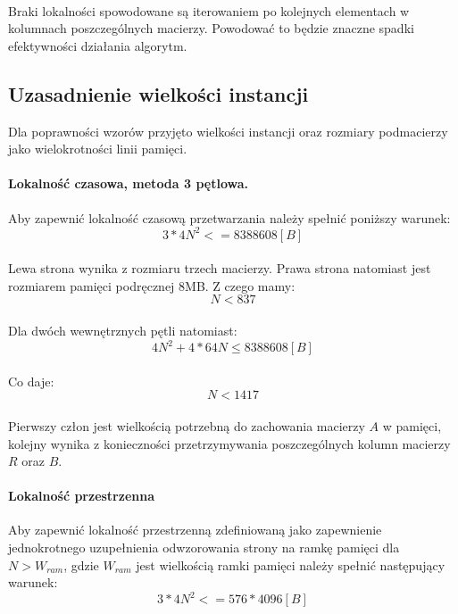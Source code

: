 \documentclass{scrartcl}
\begin{document}
\paragraph{}Braki lokalności spowodowane są iterowaniem po kolejnych elementach w kolumnach poszczególnych macierzy. Powodować to będzie znaczne spadki efektywności działania algorytm.
\subsection{Uzasadnienie wielkości instancji} Dla poprawności wzorów przyjęto wielkości instancji oraz rozmiary podmacierzy jako wielokrotności linii pamięci. 
\paragraph{Lokalność czasowa, metoda 3 pętlowa.}Aby zapewnić lokalność czasową przetwarzania należy spełnić poniższy warunek:
\begin{equation}
3 * 4N ^ 2 <= 8388608 [B]
\end{equation}
\paragraph{}Lewa strona wynika z rozmiaru trzech macierzy. Prawa strona natomiast jest rozmiarem pamięci podręcznej 8MB. Z czego mamy:
\begin{equation}
N < 837
\end{equation}
\paragraph{}Dla dwóch wewnętrznych pętli natomiast:
\begin{equation}
4N^2 + 4 * 64N \leq 8388608 [B]
\end{equation}
\paragraph{}Co daje:
\begin{equation}
N < 1417
\end{equation}
\paragraph{}Pierwszy człon jest wielkością potrzebną do zachowania macierzy $A$ w pamięci, kolejny wynika z konieczności przetrzymywania poszczególnych kolumn macierzy $R$ oraz $B$.
\paragraph{Lokalność przestrzenna}Aby zapewnić lokalność przestrzenną zdefiniowaną jako zapewnienie jednokrotnego uzupełnienia odwzorowania strony na ramkę pamięci dla $N > W_{ram}$, gdzie $W_{ram}$ jest wielkością ramki pamięci należy spełnić następujący warunek:
\begin{equation}
3*4N ^ 2 <= 576 * 4096 [B]
\end{equation}
\end{document}
